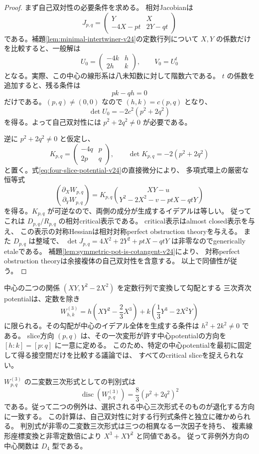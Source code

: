 \begin{proof}
まず自己双対性の必要条件を求める。
相対Jacobianは
\[
 J_{p,q}=\begin{pmatrix}Y&X\\-4X-pt&2Y-qt\end{pmatrix}
\]
である。補題\ref{lem:minimal-intertwiner-v24}の定数行列について
$X,Y$ の係数だけを比較すると、一般解は
\begin{equation}\label{eq:slice-central-intertwiners-v24}
 U_0=\begin{pmatrix}-4k&h\\2h&k\end{pmatrix},\qquad
 V_0=U_0^t
\end{equation}
となる。実際、この中心の線形系は八未知数に対して階数六である。
$t$ の係数を追加すると、残る条件は
\[
 pk-qh=0
\]
だけである。$(p,q)\ne(0,0)$ なので $(h,k)=c(p,q)$ となり、
\[
 \det U_0=-2c^2(p^2+2q^2)
\]
を得る。よって自己双対性には $p^2+2q^2\ne0$ が必要である。

逆に $p^2+2q^2\ne0$ と仮定し、
\[
 K_{p,q}=\begin{pmatrix}-4q&p\\2p&q\end{pmatrix},\qquad
 \det K_{p,q}=-2(p^2+2q^2)
\]
と置く。式\eqref{eq:four-slice-potential-v24}の直接微分により、
多項式環上の厳密な恒等式
\begin{equation}\label{eq:four-slice-gradient-v24}
 \binom{\partial_XW_{p,q}}{\partial_YW_{p,q}}
 =K_{p,q}
 \binom{XY-u}{Y^2-2X^2-v-ptX-qtY}
\end{equation}
を得る。$K_{p,q}$ が可逆なので、両側の成分が生成するイデアルは等しい。
従ってこれは $D_{p,q}/R_{p,q}$ の相対critical表示である。
critical表示はalmost closed表示を与え、
この表示の対称Hessianは相対対称perfect obstruction theoryを与える。
また $D_{p,q}$ は整域で、
$\det J_{p,q}=4X^2+2Y^2+ptX-qtY$ は非零なのでgenerically etaleである。
補題\ref{lem:symmetric-pot-is-cotangent-v24}により、
対称perfect obstruction theoryは余接複体の自己双対性を含意する。
以上で同値性が従う。
\end{proof}

\begin{remark}[中心potentialの選択と二つの例外]\label{rem:central-pencil-v24}
中心の二つの関係 $(XY,Y^2-2X^2)$ を定数行列で変換して勾配とする
三次斉次potentialは、定数を除き
\[
 W^{(3)}_{h,k}
 =h\left(XY^2-\frac23X^3\right)
 +k\left(\frac13Y^3-2X^2Y\right)
\]
に限られる。その勾配が中心のイデアル全体を生成する条件は
$h^2+2k^2\ne0$ である。
slice方向 $(p,q)$ は、その一次変形が許す中心potentialの方向を
$[h:k]=[p:q]$ に一意に定める。
このため、特定の中心potentialを最初に固定して得る接空間だけを比較する議論では、
すべてのcritical sliceを捉えられない。

$W^{(3)}_{p,q}$ の二変数三次形式としての判別式は
\[
 \operatorname{disc}(W^{(3)}_{p,q})
 =\frac83(p^2+2q^2)^2
\]
である。従って二つの例外は、選択される中心三次形式そのものが退化する方向に一致する。
この計算は、自己双対性に対する行列式条件と独立に確かめられる。
判別式が非零の二変数三次形式は三つの相異なる一次因子を持ち、
複素線形座標変換と非零定数倍により $X^3+XY^2$ と同値である。
従って非例外方向の中心関数は $D_4$ 型である。
\end{remark}

